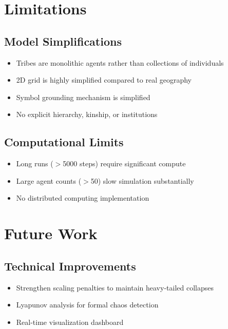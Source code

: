 \documentclass[11pt,a4paper]{article}
\begin{document}
\section{Limitations}

\subsection{Model Simplifications}

\begin{itemize}
    \item Tribes are monolithic agents rather than collections of individuals
    \item 2D grid is highly simplified compared to real geography
    \item Symbol grounding mechanism is simplified
    \item No explicit hierarchy, kinship, or institutions
\end{itemize}

\subsection{Computational Limits}

\begin{itemize}
    \item Long runs ($>$5000 steps) require significant compute
    \item Large agent counts ($>$50) slow simulation substantially
    \item No distributed computing implementation
\end{itemize}

\section{Future Work}

\subsection{Technical Improvements}

\begin{itemize}
    \item Strengthen scaling penalties to maintain heavy-tailed collapses
    \item Lyapunov analysis for formal chaos detection
    \item Real-time visualization dashboard
\end{itemize}
\end{document}
